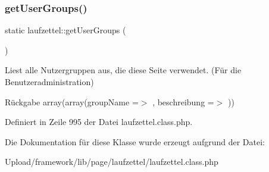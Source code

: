 \subsubsection{\texorpdfstring{get\+User\+Groups()}{getUserGroups()}}
{\footnotesize\ttfamily static laufzettel\+::get\+User\+Groups (\begin{DoxyParamCaption}{ }\end{DoxyParamCaption})\hspace{0.3cm}{\ttfamily [static]}}

Liest alle Nutzergruppen aus, die diese Seite verwendet. (Für die Benutzeradministration) \begin{DoxyReturn}{Rückgabe}
array(array(\textquotesingle{}group\+Name\textquotesingle{} =$>$ \textquotesingle{}\textquotesingle{}, \textquotesingle{}beschreibung\textquotesingle{} =$>$ \textquotesingle{}\textquotesingle{})) 
\end{DoxyReturn}


Definiert in Zeile 995 der Datei laufzettel.\+class.\+php.



Die Dokumentation für diese Klasse wurde erzeugt aufgrund der Datei\+:\begin{DoxyCompactItemize}
\item 
Upload/framework/lib/page/laufzettel/laufzettel.\+class.\+php\end{DoxyCompactItemize}
